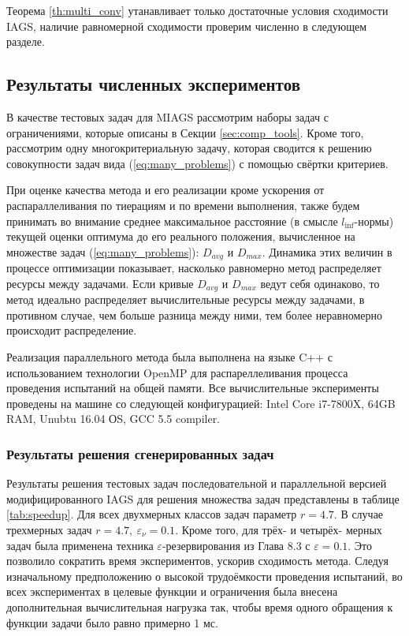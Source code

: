 Теорема \ref{th:multi_conv} утанавливает только достаточные условия сходимости IAGS, наличие равномерной сходимости проверим численно
в следующем разделе.

\subsection{Результаты численных экспериментов}

В качестве тестовых задач для MIAGS рассмотрим наборы задач с ограничениями, которые описаны в Секции \ref{sec:comp_tools}.
Кроме того, рассмотрим одну многокритериальную задачу, которая сводится к решению совокупности задач вида (\ref{eq:many_problems})
с помощью свёртки критериев.

При оценке качества метода и его реализации кроме ускорения от распараллеливания по тиерациям и по времени выполнения,
также будем принимать во внимание среднее максимальное расстояние (в смысле \(l_{\inf}\)-нормы) текущей оценки оптимума до его реального положения,
вычисленное на множестве задач (\ref{eq:many_problems}): \(D_{avg}\) и \(D_{max}\). Динамика этих величин в процессе оптимизации
показывает, насколько равномерно метод распределяет ресурсы между задачами. Если кривые \(D_{avg}\) и \(D_{max}\) ведут себя одинаково, то
метод идеально распределяет вычислительные ресурсы между задачами, в противном случае, чем больше разница между
ними, тем более неравномерно происходит распределение.

Реализация параллельного метода была выполнена на языке C++ с использованием технологии OpenMP
для распареллеливания процесса проведения испытаний на общей памяти. Все вычислительные
эксперименты проведены на машине со следующей конфигурацией: Intel Core i7-7800X, 64GB RAM, Unubtu 16.04 ОS, GCC 5.5 compiler.

\subsubsection{Результаты решения сгенерированных задач}

Результаты решения тестовых задач последовательной и параллельной версией модифицированного IAGS
для решения множества задач представлены в таблице \ref{tab:speedup}. Для всех двухмерных классов задач параметр \(r=4.7\).
В случае трехмерных задач \(r=4.7,\: \varepsilon_\nu=0.1\).
Кроме того, для трёх- и четырёх- мерных задач была применена техника \(\varepsilon\)-резервирования из \cite{Strongin2000} Глава 8.3 с
\(\varepsilon=0.1\). Это позволило сократить время экспериментов, ускорив сходимость метода.
Следуя изначальному предположению о высокой трудоёмкости проведения испытаний,
во всех экспериментах в целевые функции и ограничения была внесена дополнительная вычислительная нагрузка так,
чтобы время одного обращения к функции задачи было равно примерно 1 мс.

